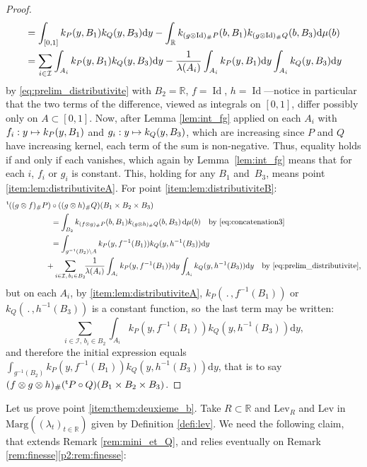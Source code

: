 \documentclass[10pt,a4paper]{article}
\newcommand\mto{\mathchoice{\longmapsto}{\mapsto}{\mapsto}{\mapsto}}
\theoremstyle{plain}
\theoremstyle{definition}
\newcommand{\dd}{\mathrm{d}}
\newcommand{\lev}{\mathrm{Lev}}
\newcommand{\Id}{\operatorname{Id}}
\newcommand{\trans}{{}^{\mathrm{t}}\mkern-1mu}
\newcommand{\la}{\lambda}
\newcommand{\ma}{\mathrm{Marg}}
\newcommand{\R}{\mathbb{R}}
\begin{document}
\begin{proof}
\begin{align*}
&=\int_{[0,1]}k_{P}(y,B_1)k_Q(y,B_3)\dd y-\int_{\R}k_{(g\otimes \Id)_\#P}(b,B_1)k_{(g \otimes {\rm Id})_\#Q}(b,B_3)\dd\mu(b)\\
&=\sum_{i\in\mathcal{I}}\int_{A_i}k_{P}(y,B_1)k_{Q}(y,B_3)\dd y-\frac1{\la(A_i)}\int_{A_i}k_{P}(y,B_1)\dd y\int_{A_i}k_{Q}(y,B_3)\dd y
\end{align*}
by \eqref{eq:prelim_distributivite} with $B_2=\R$, $f=\Id$, $h=\Id$---notice in particular that the two terms of the difference, viewed as integrals on $[0,1]$, differ possibly only on $A\subset[0,1]$. Now, after Lemma \ref{lem:int_fg} applied on each $A_i$ with $f_i:y\mto k_{P}(y,B_1)$ and $g_i:y\mto k_{Q}(y,B_3)$, which are increasing since $P$ and $Q$ have increasing kernel, each term of the sum is non-negative. Thus, equality holds if and only if each vanishes, which again by Lemma~\ref{lem:int_fg} means that for each $i$, $f_i$ or $g_i$ is constant. This, holding for any $B_1$ and~$B_3$, means point \eqref{item:lem:distributiviteA}. For point \eqref{item:lem:distributiviteB}:\vspace*{-3pt}
\begin{align*}
\trans((g\otimes f)_\# P)&\circ ((g \otimes h)_\#Q)(B_1\times B_2\times B_3)\\
&=\int_{B_2} k_{(f\otimes g)_\#P}(b,B_1)k_{(g\otimes h)_\#Q}(b,B_3)\,\dd \mu(b)\quad\text{by \eqref{eq:concatenation3}}\\
&=\int_{g^{-1}(B_2)\setminus A} k_{P}(y,f^{-1}(B_1))k_{Q}(y,h^{-1}(B_3))\dd y\\
&\!\!\!\!+\sum_{i\in \mathcal{I},\,b_i\in B_2}\!\!\frac1{\la(A_i)}\int_{A_i}k_{P}(y,f^{-1}(B_1))\dd y\int_{A_i}k_{Q}(y,h^{-1}(B_3))\dd y\quad\text{by \eqref{eq:prelim_distributivite},}
\end{align*}
but on each $A_i$, by \eqref{item:lem:distributiviteA}, $k_{P}(\,.\,,f^{-1}(B_1))$ or $k_{Q}(\,.\,,h^{-1}(B_3))$ is a constant function, so~the last term may be written:\vspace*{-3pt}
\[\sum_{i\in \mathcal{I},\,b_i\in B_2}\!\int_{A_i}k_{P}(y,f^{-1}(B_1))k_{Q}(y,h^{-1}(B_3))\dd y,\]
and therefore the initial expression equals $\int_{g^{-1}(B_2)} k_{P}(y,f^{-1}(B_1))k_{Q}(y,h^{-1}(B_3))\dd y$, that is to say $(f\otimes g \otimes h)_\#(\trans P\circ Q)(B_1\times B_2\times B_3)$.
\end{proof}

Let us prove point \eqref{item:them:deuxieme_b}. Take $R\subset\R$ and $\lev_R$ and $\lev$ in $\ma((\la_t)_{t\in\R})$ given by Definition \ref{defi:lev}. We need the following claim, that extends Remark \ref{rem:mini_et_Q}, and relies eventually on Remark \ref{rem:finesse}\eqref{p2:rem:finesse}:
\end{document}
